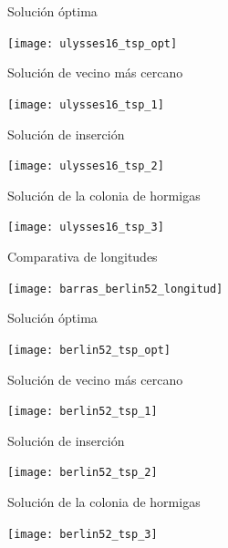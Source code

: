 \begin{frame}{Solución óptima}
\begin{center}
	\texttt{[image: ulysses16\_tsp\_opt]}
\end{center}
\end{frame}

\begin{frame}{Solución de vecino más cercano}
	\begin{center}
		\texttt{[image: ulysses16\_tsp\_1]}
	\end{center}
\end{frame}

\begin{frame}{Solución de inserción}
	\begin{center}
		\texttt{[image: ulysses16\_tsp\_2]}
	\end{center}
\end{frame}

\begin{frame}{Solución de la colonia de hormigas}
	\begin{center}
		\texttt{[image: ulysses16\_tsp\_3]}
	\end{center}
\end{frame}

\begin{frame}{Comparativa de longitudes}
	\begin{center}
		\texttt{[image: barras\_berlin52\_longitud]}
	\end{center}
\end{frame}

\begin{frame}{Solución óptima}
	\begin{center}
		\texttt{[image: berlin52\_tsp\_opt]}
	\end{center}
\end{frame}

\begin{frame}{Solución de vecino más cercano}
	\begin{center}
		\texttt{[image: berlin52\_tsp\_1]}
	\end{center}
\end{frame}

\begin{frame}{Solución de inserción}
	\begin{center}
		\texttt{[image: berlin52\_tsp\_2]}
	\end{center}
\end{frame}

\begin{frame}{Solución de la colonia de hormigas}
	\begin{center}
		\texttt{[image: berlin52\_tsp\_3]}
	\end{center}
\end{frame}

